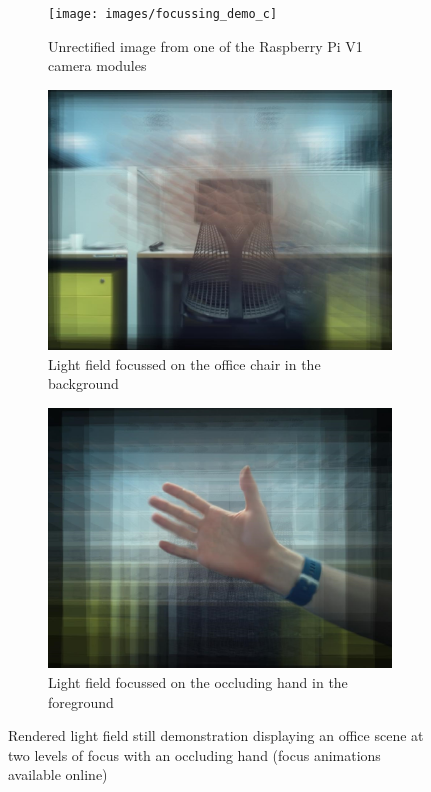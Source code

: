 \documentclass{article} \usepackage{acra}
\begin{document}
\begin{figure}[H] \centering
  \begin{subfigure}[b]{0.95\columnwidth}
    \texttt{[image: images/focussing\_demo\_c]}
    \caption{Unrectified image from one of the Raspberry Pi V1 camera modules}
  \end{subfigure}
  \begin{subfigure}[b]{0.95\columnwidth}
    \includegraphics[width=\textwidth]{images/focussing_demo_d}
    \caption{Light field focussed on the office chair in the background}
  \end{subfigure}
  \begin{subfigure}[b]{0.95\columnwidth}
    \includegraphics[width=\textwidth]{images/focussing_demo_b}
    \caption{Light field focussed on the occluding hand in the foreground}
  \end{subfigure}
  \caption{Rendered light field still demonstration displaying an office scene
    at two levels of focus with an occluding hand (focus animations available
    online) \protect\cite{stewart2017using}}
  \label{fig:focussing_demo}
\end{figure}
\end{document}
